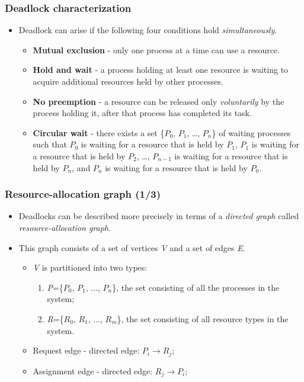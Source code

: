 \documentclass[CJKutf8,xcolor=pdftex,dvipsnames,table]{beamer}
\begin{document}
\begin{CJK*}{UTF8}{song}
  \begin{frame}
  \frametitle{Deadlock characterization} \pause
  \begin{itemize}
  \item{Deadlock can arise if the following four conditions hold \emph{simultaneously}.} \pause
    \begin{itemize}
    \item{\textbf{Mutual exclusion} \pause - only one process at a time can use a resource.} \pause
    \item{\textbf{Hold and wait} \pause - a process holding at least one resource is waiting to acquire additional resources held by other processes.} \pause
    \item{\textbf{No preemption} \pause - a resource can be released only \emph{voluntarily} by the process holding it, after that process has completed its task.} \pause
    \item{\textbf{Circular wait} \pause - there exists a set \{$P_0$, $P_1$, …, $P_n$\} of waiting processes such that $P_0$ is waiting for a resource that is held by $P_1$, $P_1$ is waiting for a resource that is held by $P_2$, …, $P_{n-1}$ is waiting for a resource that is held by $P_n$, and $P_n$ is waiting for a resource that is held by $P_0$.}
    \end{itemize}
  \end{itemize}
  \end{frame}

  \begin{frame}
  \frametitle{Resource-allocation graph (1/3)} \pause
  \begin{itemize}
  \item{Deadlocks can be described more precisely in terms of a \emph{directed graph} called \emph{resource-allocation graph}.} \pause
  \item{This graph consists of a set of vertices \emph{V} and a set of edges \emph{E}.} \pause
    \begin{itemize}
    \item{\emph{V} is partitioned into two types:} \pause
      \begin{enumerate}
      \item{\emph{P}=\{$P_0$, $P_1$, ..., $P_n$\}, the set consisting of all the processes in the system;} \pause
      \item{\emph{R}=\{$R_0$, $R_1$, ..., $R_m$\}, the set consisting of all resource types in the system.} \pause
      \end{enumerate}
    \item{Request edge \pause - directed edge: $P_i \rightarrow R_j$;} \pause
    \item{Assignment edge \pause - directed edge: $R_j \rightarrow P_i$;}
    \end{itemize}
  \end{itemize}
  \end{frame}


\end{CJK*}
\end{document}
